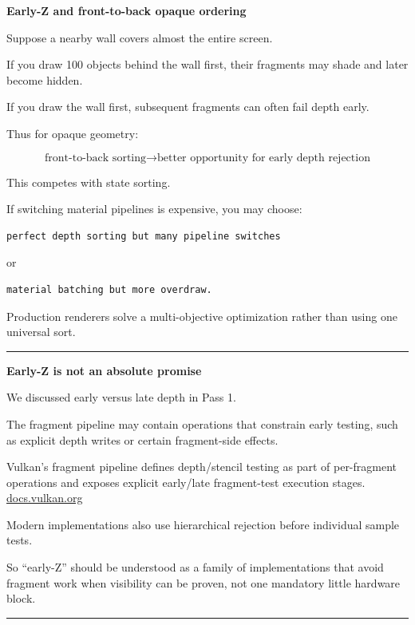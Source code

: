\textbf{Early-Z and front-to-back opaque ordering}

Suppose a nearby wall covers almost the entire screen.

If you draw 100 objects behind the wall first, their fragments may shade and later become hidden.

If you draw the wall first, subsequent fragments can often fail depth early.

Thus for opaque geometry:

\[
\boxed{
\text{front-to-back sorting}
\rightarrow
\text{better opportunity for early depth rejection}
}
\]

This competes with state sorting.

If switching material pipelines is expensive, you may choose:

\begin{verbatim}
perfect depth sorting but many pipeline switches
\end{verbatim}

or

\begin{verbatim}
material batching but more overdraw.
\end{verbatim}

Production renderers solve a multi-objective optimization rather than using one universal sort.

\begin{center}\rule{0.5\linewidth}{0.5pt}\end{center}

\textbf{Early-Z is not an absolute promise}

We discussed early versus late depth in Pass 1.

The fragment pipeline may contain operations that constrain early testing, such as explicit depth writes or certain fragment-side effects.

Vulkan's fragment pipeline defines depth/stencil testing as part of per-fragment operations and exposes explicit early/late fragment-test execution stages. \href{https://docs.vulkan.org/spec/latest/chapters/fragops.html?utm_source=chatgpt.com}{docs.vulkan.org}

Modern implementations also use hierarchical rejection before individual sample tests.

So ``early-Z'' should be understood as a family of implementations that avoid fragment work when visibility can be proven, not one mandatory little hardware block.

\begin{center}\rule{0.5\linewidth}{0.5pt}\end{center}

